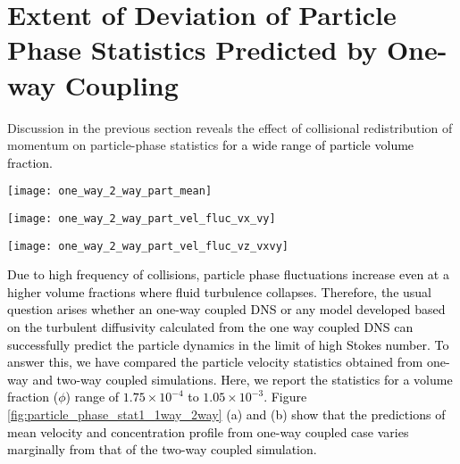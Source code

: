\documentclass[notitlepage]{revtex4-1}
\begin{document}
\section{Extent of Deviation of Particle Phase Statistics Predicted by One-way Coupling}
\label{sec:one-way_two_way}
Discussion in the previous section reveals the effect of collisional redistribution of momentum on particle-phase statistics \textcolor{black}{for a wide range of particle volume fraction.} 
\begin{figure*}[!]
			\texttt{[image: one\_way\_2\_way\_part\_mean]}
			\caption{Effect of reverse feedback force at different particle volume fraction on (a) mean velocity, and (b) particle number concentration} 
			\label{fig:particle_phase_stat1_1way_2way}
\end{figure*}
\begin{figure*}[!]
			\texttt{[image: one\_way\_2\_way\_part\_vel\_fluc\_vx\_vy]}
			\caption{Effect of reverse feedback force at different particle volume fraction on  (a) streamwise and (b) cross-stream mean square velocity of the particle phase}
			\label{fig:particle_phase_stat2_1way_2way} 
\end{figure*} 
\begin{figure*}[!]
			\texttt{[image: one\_way\_2\_way\_part\_vel\_fluc\_vz\_vxvy]}
			\caption{Effect of reverse feedback force at different particle volume fraction on (a) span-wise mean square velocity, (b) streamwise and cross-stream velocity cross-correlation of the particle phase} 
			\label{fig:particle_phase_stat3_1way_2way}
\end{figure*}
\textcolor{black}{Due to high frequency of collisions, particle phase fluctuations increase even at a higher volume fractions where fluid turbulence collapses. Therefore, the usual question arises whether an one-way coupled DNS or any model developed based on the turbulent diffusivity calculated from the one way coupled DNS can successfully predict the particle dynamics in the limit of high Stokes number. To answer this, we have compared the particle velocity statistics obtained from one-way and two-way coupled simulations. Here, we report the statistics for a volume fraction ($\phi$) range of $1.75\times10^{-4}$ to $1.05\times10^{-3}$. Figure \ref{fig:particle_phase_stat1_1way_2way} (a) and (b) show that the predictions of mean velocity and concentration profile from one-way coupled case varies marginally from that of the two-way coupled simulation.}
\end{document}
